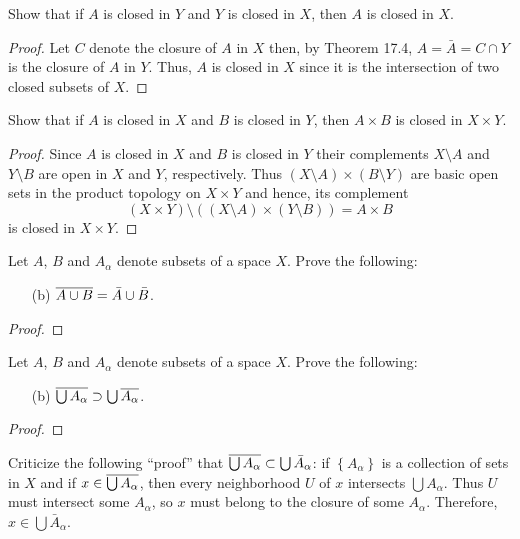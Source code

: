 \begin{problem}[Munkres \S17, p.\,100, 2]
Show that if $A$ is closed in $Y$ and $Y$ is closed in $X$, then
$A$ is closed in $X$.
\end{problem}
\begin{proof}
Let $C$ denote the closure of $A$ in $X$ then, by Theorem 17.4,
$A=\bar A=C\cap Y$ is the closure of $A$ in $Y$. Thus, $A$ is
closed in $X$ since it is the intersection of two closed subsets
of $X$.
\end{proof}
\newpage
\begin{problem}[Munkres \S17, p.\,100, 3]
Show that if $A$ is closed in $X$ and $B$ is closed in $Y$, then
$A\times B$ is closed in $X\times Y$.
\end{problem}
\begin{proof}
Since $A$ is closed in $X$ and $B$ is closed in $Y$ their
complements $X\setminus A$ and $Y\setminus B$ are open in $X$ and
$Y$, respectively. Thus $(X\setminus A)\times (B\setminus Y)$ are
basic open sets in the product topology on $X\times Y$ and hence,
its complement
\[
(X\times Y)\setminus\left((X\setminus A)\times(Y\setminus
  B)\right)
=A\times B
\]
is closed in $X\times Y$.

\end{proof}
\newpage
\begin{problem}[Munkres \S17, p.\,101, 6(b)]
Let $A$, $B$ and $A_\alpha$ denote subsets of a space $X$. Prove
the following:
\begin{enumerate}[noitemsep]
\item[(b)] $\overline{A\cup B}=\bar A\cup\bar B$.
\end{enumerate}
\end{problem}
\begin{proof}
\end{proof}
\newpage
\begin{problem}[Munkres \S17, p.\,101, 6(c)]
Let $A$, $B$ and $A_\alpha$ denote subsets of a space $X$. Prove
the following:
\begin{enumerate}[noitemsep]
\item[(b)] $\overline{\bigcup A_\alpha}\supset\bigcup\overline{A_\alpha}$.
\end{enumerate}
\end{problem}
\begin{proof}
\end{proof}
\newpage
\begin{problem}[Munkres \S17, p.\,101, 7]
Criticize the following ``proof'' that $\overline{\bigcup
  A_\alpha}\subset\bigcup\bar A_\alpha$: if
$\left\{A_\alpha\right\}$ is a collection of sets in $X$ and if
$x\in\overline{\bigcup A_\alpha}$, then every neighborhood $U$ of $x$
intersects $\bigcup A_\alpha$. Thus $U$ must intersect some
$A_\alpha$, so $x$ must belong to the closure of some
$A_\alpha$. Therefore, $x\in\bigcup\bar A_\alpha$.
\end{problem}
